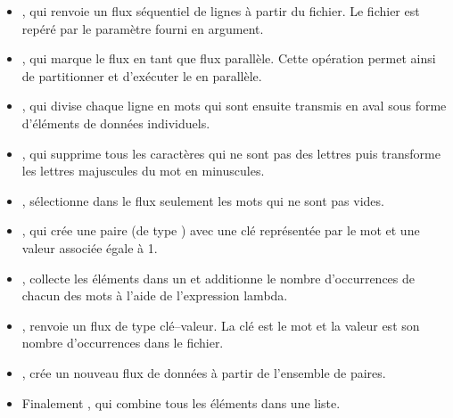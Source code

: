 \begin{itemize}
	\item {}, qui renvoie un flux s\'equentiel de lignes \`a partir du fichier. Le fichier est rep\'er\'e par le param\`etre  fourni en argument.



	\item {}, qui marque le flux en tant que flux parall\`ele. Cette op\'eration permet ainsi de partitionner et d'ex\'ecuter le  en parall\`ele.

	\item {}, qui divise chaque ligne en mots qui sont ensuite transmis en aval sous forme d'\'el\'ements de donn\'ees individuels.
	
	\item {}, qui supprime tous les caract\`eres qui ne sont pas des lettres puis transforme les lettres majuscules du mot en minuscules.
	
	\item {},  s\'electionne dans le flux seulement les mots qui ne sont pas vides.
	
	\item {}, qui cr\'ee une paire (de type ) avec une cl\'e repr\'esent\'ee par le mot et une valeur associ\'ee \'egale \`a 1.
	
	\item {},  collecte les \'el\'ements dans un  et additionne le nombre d'occurrences de chacun des mots \`a l'aide de l'expression lambda.
	
	\item {},  renvoie un flux de type cl\'e--valeur. La cl\'e est le mot et la valeur est son nombre d'occurrences dans le fichier.

	\item {}, cr\'ee un nouveau flux de donn\'ees \`a partir de l'ensemble de paires.
	
	\item Finalement , qui combine tous les \'el\'ements dans une liste.
	
	
\end{itemize}


